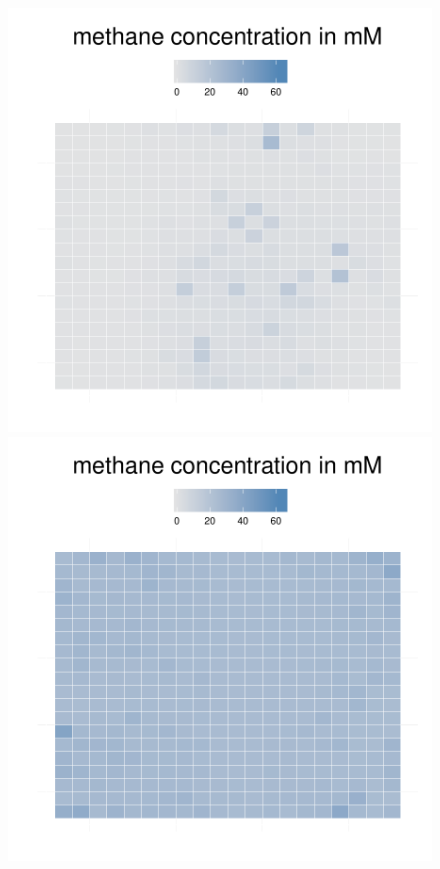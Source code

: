 \begin{figure}[h!]
{\begin{minipage}[t]{0.3\textwidth}
  \end{minipage}
  \begin{minipage}[t]{0.3\textwidth}
    \includegraphics[width=\textwidth]{../results/img/barkeri_beijerinckii_20x20_seed2942_methane100.pdf}
  \end{minipage}
  \begin{minipage}[t]{0.3\textwidth}
    \includegraphics[width=\textwidth]{../results/img/barkeri_beijerinckii_20x20_seed2942_methane150.pdf}

\end{minipage}}
\end{figure}
